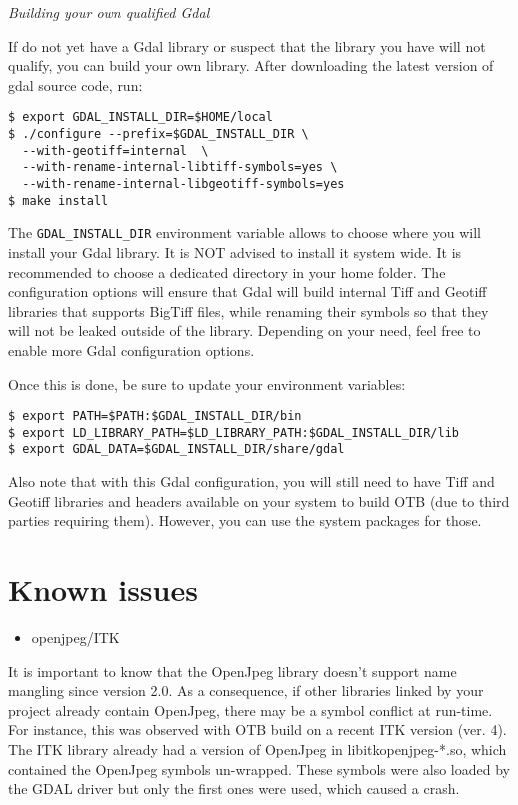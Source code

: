 \emph{Building your own qualified Gdal}

If do not yet have a Gdal library or suspect that the library you have will not qualify, you can build your own library. After downloading the latest version of gdal source code, run:

\begin{verbatim}
$ export GDAL_INSTALL_DIR=$HOME/local
$ ./configure --prefix=$GDAL_INSTALL_DIR \
  --with-geotiff=internal  \
  --with-rename-internal-libtiff-symbols=yes \
  --with-rename-internal-libgeotiff-symbols=yes
$ make install
\end{verbatim}

The \texttt{GDAL\_INSTALL\_DIR} environment variable allows to choose where you will install your Gdal library. It is NOT advised to install it system wide. It is recommended to choose a dedicated directory in your home folder. The configuration options will ensure that Gdal will build internal Tiff and Geotiff libraries that supports BigTiff files, while renaming their symbols so that they will not be leaked outside of the library. Depending on your need, feel free to enable more Gdal configuration options.

Once this is done, be sure to update your environment variables:
\begin{verbatim}
$ export PATH=$PATH:$GDAL_INSTALL_DIR/bin
$ export LD_LIBRARY_PATH=$LD_LIBRARY_PATH:$GDAL_INSTALL_DIR/lib
$ export GDAL_DATA=$GDAL_INSTALL_DIR/share/gdal
\end{verbatim}

Also note that with this Gdal configuration, you will still need to have Tiff and Geotiff libraries and headers available on your system to build OTB (due to third parties requiring them). However, you can use the system packages for those.

\section{Known issues}
\label{sec:knownissues}

\begin{itemize}
\item  openjpeg/ITK 
\end{itemize}

It is important to know that the OpenJpeg library doesn't support name mangling since version 2.0. 
As a consequence, if other libraries linked by your project already contain OpenJpeg, there may be a symbol conflict at run-time. 
For instance, this was observed with OTB build on a recent ITK version (ver. 4). 
The ITK library already had a version of OpenJpeg in libitkopenjpeg-*.so, which contained the OpenJpeg symbols un-wrapped.
These symbols were also loaded by the GDAL driver but only the first ones were used, which caused a crash. 

